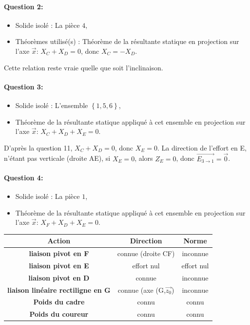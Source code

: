 \paragraph{Question 2:}

\begin{itemize}
 \item Solide isolé : La pièce $4$,
 \item Théorèmes utilisé(s) : Théorème de la résultante statique en projection sur l'axe $\overrightarrow{x}$: $X_C+X_D=0$, donc $X_C=-X_D$.
\end{itemize}

Cette relation reste vraie quelle que soit l'inclinaison.

\paragraph{Question 3:}

\begin{itemize}
 \item Solide isolé : L'ensemble $\left\{1,5,6 \right\}$,
 \item Théorème de la résultante statique appliqué à cet ensemble en projection sur l'axe $\overrightarrow{x}$: $X_C+X_D+X_E=0$.
\end{itemize}

D'après la question 11, $X_C+X_D=0$, donc $X_E=0$. La direction de l'effort en E, n'étant pas verticale (droite AE), si $X_E=0$, alors $Z_E=0$, donc $\overrightarrow{E_{3\rightarrow 1}}=\overrightarrow{0}$.

\paragraph{Question 4:}

\begin{itemize}
 \item Solide isolé : La pièce $1$,
 \item Théorème de la résultante statique appliqué à cet ensemble en projection sur l'axe $\overrightarrow{x}$: $X_F+X_D+X_E=0$.
\end{itemize}

\begin{center}
\begin{tabular}{|c|c|c|}
\hline
Action & Direction & Norme \\
\hline
\textbf{liaison pivot en F} & connue (droite CF) & inconnue \\
\hline
\textbf{liaison pivot en E} & effort nul & effort nul \\
\hline
\textbf{liaison pivot en D} & connue & inconnue \\
\hline
\textbf{liaison linéaire rectiligne en G} & connue (axe (G,$\overrightarrow{z_0}$) & inconnue \\
\hline
\textbf{Poids du cadre} & connu & connu \\
\hline
\textbf{Poids du coureur} & connu & connu \\
\hline
\end{tabular}
\end{center}

